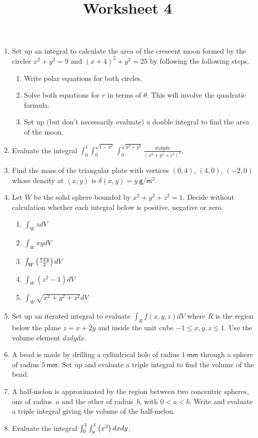 \documentclass[12pt]{article}
\title{Worksheet 4}
\author{}\date{}
\let\sin\relax\DeclareMathOperator{\sin}{\mathsf{sin}}
\begin{document}
\maketitle
\thispagestyle{empty}

\begin{enumerate}
\item Set up an integral to calculate
the area of the crescent moon formed by
the circles $x^2+y^2=9$ and $\left(x+4\right)^2+y^2=25$
by following the following steps.
\begin{enumerate}
\item Write polar equations for both circles.
\item Solve both equations for $r$ in terms of $\theta$. This
will involve the quadratic formula.
\item Set up (but don't necessarily evaluate)
a double integral to find the area
of the moon.
\end{enumerate}

\item Evaluate the integral
$\int_0^1\int_0^{\sqrt{1-x^2}}\int_0^{\sqrt{x^2+y^2}}
\frac{dzdydx}{\left(x^2+y^2+z^2\right)^2}$.

\item Find the mass of the triangular plate with vertices
$\left(0,4\right)$, $\left(4,0\right)$, $\left(-2,0\right)$
whose density at $\left(x,y\right)$ is $\delta\left(x,y\right)
=y~\mathsf{g}/\mathsf{m}^2$.

\item Let $W$ be the solid sphere bounded by $x^2+y^2+z^2=1$.
Decide without calculation whether each integral below
is positive, negative or zero.
\begin{enumerate}
\item $\int_WzdV$
\item $\int_WxydV$
\item $\int_W\sin\left(\frac{\pi xy}{2}\right)dV$
\item $\int_W\left(z^2-1\right)dV$
\item $\int_W\sqrt{x^2+y^2+z^2}dV$
\end{enumerate}

\item Set up an iterated integral to evaluate
$\int_Rf\left(x,y,z\right)dV$ where $R$ is
the region below the plane $z=x+2y$ and inside
the unit cube $-1\le x,y,z\le 1$. Use the volume
element $dzdydx$.

\item A bead is made by drilling a cylindrical
hole of radius $1~\mathsf{mm}$ through a sphere
of radius $5~\mathsf{mm}$. Set up and evaluate
a triple integral to find the volume of the bead.

\item A half-melon is approximated by the region
between two concentric spheres, one of radius~$a$
and the other of radius~$b$, with $0<a<b$. Write
and evaluate a triple integral giving the volume
of the half-melon.

\item Evaluate the integral
$\int_0^1\int_y^1\sin\left(x^2\right)dxdy$.

\end{enumerate}
\end{document}
